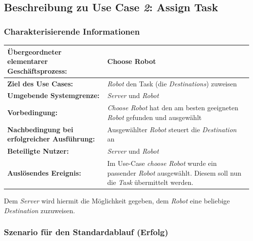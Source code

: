 			
		\pagebreak

		\subsection{Beschreibung zu Use Case \emph{2}: Assign Task}
		
		\subsubsection*{Charakterisierende Informationen}
		
		\begin{table}[H]
			\centering
			\begin{tabularx}{\textwidth}{|p{5cm}|X|}
				\hline
				\textbf{Übergeordneter elementarer Geschäftsprozess:} & Choose Robot  \\ \hline
				\textbf{Ziel des Use Cases:} & \emph{Robot} den Task (die \emph{Destinations}) zuweisen\\ \hline
				\textbf{Umgebende Systemgrenze:} & \emph{Server} und \emph{Robot} \\ \hline
				\textbf{Vorbedingung:} & \textit{ \glqq Choose Robot \grqq } hat den am besten geeigneten \emph{Robot} gefunden und ausgewählt\\ \hline
				\textbf{Nachbedingung bei erfolgreicher Ausführung:} & Ausgewählter \emph{Robot} steuert die \emph{Destination} an\\ \hline
				\textbf{Beteiligte Nutzer:} & \emph{Server} und \emph{Robot}\\ \hline
				\textbf{Auslösendes Ereignis:} & Im Use-Case \textit{ \glqq choose Robot \grqq } wurde ein passender \emph{Robot} ausgewählt. Diesem soll nun die \emph{Task} übermittelt werden. \\
				\hline
			\end{tabularx}
		\end{table}
		
		Dem \emph{Server} wird hiermit die Möglichkeit gegeben, dem \emph{Robot} eine beliebige \emph{Destination} zuzuweisen. 
		
		\subsubsection*{Szenario für den Standardablauf (Erfolg)}
		

